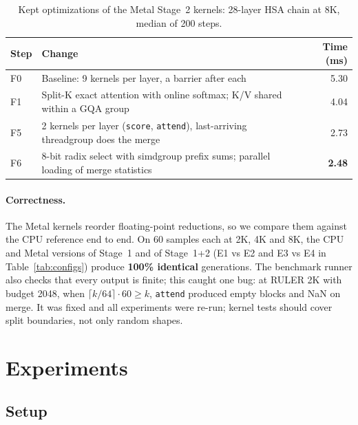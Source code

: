 \documentclass[10pt,letterpaper]{article}
\newcommand{\code}[1]{\texttt{#1}}
\newcommand{\best}[1]{\textbf{#1}}
\begin{document}
\begin{table}[h]
\centering\small
\caption{Kept optimizations of the Metal Stage~2 kernels: 28-layer HSA chain at 8K, median of 200 steps.}
\label{tab:opt}
\begin{tabular}{llr}
\toprule
Step & Change & Time (ms) \\
\midrule
F0 & Baseline: 9 kernels per layer, a barrier after each & 5.30 \\
F1 & Split-K exact attention with online softmax; K/V shared within a GQA group & 4.04 \\
F5 & 2 kernels per layer (\code{score}, \code{attend}), last-arriving threadgroup does the merge & 2.73 \\
F6 & 8-bit radix select with simdgroup prefix sums; parallel loading of merge statistics & \best{2.48} \\
\bottomrule
\end{tabular}
\end{table}

\paragraph{Correctness.}
The Metal kernels reorder floating-point reductions, so we compare them against the CPU reference end to end. On 60 samples each at 2K, 4K and 8K, the CPU and Metal versions of Stage~1 and of Stage~1+2 (E1 vs E2 and E3 vs E4 in Table~\ref{tab:configs}) produce \textbf{100\% identical} generations. The benchmark runner also checks that every output is finite; this caught one bug: at RULER 2K with budget 2048, when $\lceil k/64\rceil \cdot 60 \ge k$, \code{attend} produced empty blocks and NaN on merge. It was fixed and all experiments were re-run; kernel tests should cover split boundaries, not only random shapes.

\section{Experiments}

\subsection{Setup}
\end{document}
